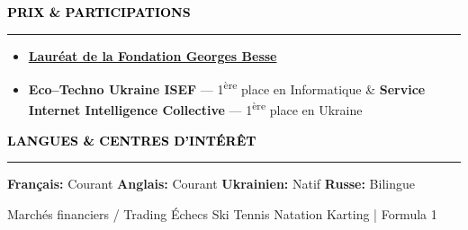 \documentclass[10pt,english,french]{article}
\newcommand{\chessIcon}[1][black]{\textcolor{#1}{\faChess}}
\newcommand{\skiIcon}[1][black]{\textcolor{#1}{\faSkiing}}
\newcommand{\cryptoIcon}[1][black]{\textcolor{#1}{\faBitcoin}}
\newcommand{\swimmingIcon}[1][black]{\textcolor{#1}{\faSwimmer}}
\newcommand{\mountainsIcon}[1][black]{\textcolor{#1}{\faMountain}}
\newcommand{\awardIcon}[1][black]{\textcolor{#1}{\faTrophy}}
\newcommand{\speechBubbleIcon}[1][black]{\textcolor{#1}{\faComment}}
\newcommand{\tradingIcon}[1][black]{\textcolor{#1}{\faChartBar}}
\newcommand{\tennisIcon}[1][black]{\textcolor{#1}{\faBaseballBall}}
\newcommand{\flagIcon}[1][black]{\textcolor{#1}{\faFlagCheckered}}
\newlength{\mpwidth}
\newcommand{\cvsection}[1]{
    \vspace{4pt}
    \textbf{\fontsize{9pt}{10pt}\selectfont \textcolor{black}{#1}}
    \vspace{6pt}
    \hrule
    \vspace{6pt}
}
\newcommand{\cvtextnotab}[1]{
    \parbox{1\mpwidth}{#1}
}
\begin{document}
\vspace{-3pt}
\cvsection{\awardIcon[black]\hspace{4pt}PRIX \& PARTICIPATIONS}

\vspace{-6pt}
\begin{itemize}[leftmargin=0.35cm, label=\textbullet, itemsep=0.15em]
    \item \textbf{\href{https://www.fondationbesse.com/}{Lauréat de la Fondation Georges Besse}}
    \item \textbf{Eco\hspace{3pt}--\hspace{3pt}Techno Ukraine ISEF} --- 1\textsuperscript{ère} place en Informatique \& \textbf{Service Internet Intelligence Collective} --- 1\textsuperscript{ère} place en Ukraine
\end{itemize}

\vspace{-5pt}
\cvsection{\speechBubbleIcon[black]\hspace{4pt}LANGUES \& CENTRES D'INTÉRÊT}

\vspace{-3pt}
\cvtextnotab{\textbf{Français\!:} Courant \hspace{12pt} \textbf{Anglais\!:} Courant \hspace{12pt} \textbf{Ukrainien\!:} Natif \hspace{20pt} \textbf{Russe\!:} Bilingue}

\vspace{-8pt}
\cvtextnotab{
    \tradingIcon[black]\hspace{2pt}Marchés financiers / Trading \hspace{12pt}
    \chessIcon[black]\hspace{2pt}Échecs \hspace{12pt}
    \skiIcon[black]\hspace{2pt}Ski \hspace{12pt}
    \tennisIcon[black]\hspace{2pt}Tennis \hspace{12pt}
    \swimmingIcon[black]\hspace{2pt}Natation \hspace{12pt}
    \flagIcon[black]\hspace{2pt}Karting | Formula 1
}
\end{document}
